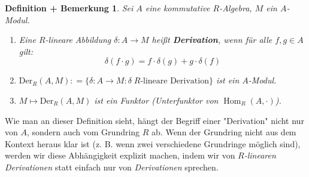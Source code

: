 \documentclass[a4paper,12pt]{scrbook}
\theoremstyle{break}
\newtheorem{DefBem}[Def]{Definition + Bemerkung}
\theoremstyle{nonumberbreak}
\theoremstyle{nonumberplain}
\newcommand{\emp}[1]{\textbf{\emph{#1}}}
\newcommand{\defeqr}[0]{\mathrel{\mathop:}=}
\DeclareMathOperator{\Hom}{Hom}
\begin{document}
\begin{DefBem}
  Sei $A$ eine kommutative $R$-Algebra, $M$ ein $A$-Modul.

  \begin{enumerate}
    \item Eine $R$-lineare Abbildung $\delta: A \to M$ heißt
          \emp{Derivation}, wenn für alle $f,g \in A$ gilt:
          \[\delta(f \cdot g) = f \cdot \delta(g) + g \cdot \delta(f)\]
    \item $\mbox{Der}_R(A,M) \defeqr \{ \delta: A \to M: \delta \;
          R\text{-lineare Derivation}\}$ ist ein $A$-Modul.
    \item $M \mapsto \mbox{Der}_R(A,M)$ ist ein Funktor (Unterfunktor von $\Hom_R(A,\cdot)$).
  \end{enumerate}
\end{DefBem}

Wie man an dieser Definition sieht, hängt der Begriff einer "Derivation" nicht nur von $A$, sondern auch vom Grundring $R$ ab. Wenn der Grundring nicht aus dem Kontext heraus klar ist (z. B. wenn zwei verschiedene Grundringe möglich sind), werden wir diese Abhängigkeit explizit machen, indem wir von \textit{$R$-linearen Derivationen} statt einfach nur von \textit{Derivationen} sprechen.
\end{document}
